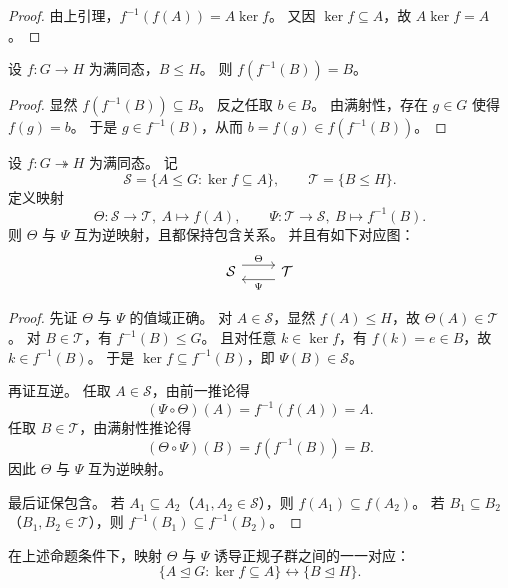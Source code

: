 \documentclass[lang=cn,a4paper,newtx]{elegantbook}
\begin{document}
\begin{proof}
由上引理，$f^{-1}(f(A))=A\ker f$。
又因 $\ker f\subseteq A$，故 $A\ker f=A$。
\end{proof}

\begin{corollary}
设 $f:G\to H$ 为满同态，$B\le H$。
则 $f(f^{-1}(B))=B$。
\end{corollary}

\begin{proof}
显然 $f(f^{-1}(B))\subseteq B$。
反之任取 $b\in B$。
由满射性，存在 $g\in G$ 使得 $f(g)=b$。
于是 $g\in f^{-1}(B)$，从而 $b=f(g)\in f(f^{-1}(B))$。
\end{proof}

\begin{proposition}[满同态下的子群对应]
设 $f:G\twoheadrightarrow H$ 为满同态。
记
\[
  \mathcal S=\{A\le G:\ker f\subseteq A\},\qquad \mathcal T=\{B\le H\}.
\]
定义映射
\[
  \Theta:\mathcal S\to \mathcal T,\ A\mapsto f(A),
\qquad
  \Psi:\mathcal T\to \mathcal S,\ B\mapsto f^{-1}(B).
\]
则 $\Theta$ 与 $\Psi$ 互为逆映射，且都保持包含关系。
并且有如下对应图：
\[
\begin{tikzcd}
 \mathcal S \arrow[r,shift left=1.2ex,"\Theta"] & \mathcal T \arrow[l,shift left=1.2ex,"\Psi"]
\end{tikzcd}
\]
\end{proposition}

\begin{proof}
先证 $\Theta$ 与 $\Psi$ 的值域正确。
对 $A\in \mathcal S$，显然 $f(A)\le H$，故 $\Theta(A)\in \mathcal T$。
对 $B\in \mathcal T$，有 $f^{-1}(B)\le G$。
且对任意 $k\in \ker f$，有 $f(k)=e\in B$，故 $k\in f^{-1}(B)$。
于是 $\ker f\subseteq f^{-1}(B)$，即 $\Psi(B)\in \mathcal S$。

再证互逆。
任取 $A\in \mathcal S$，由前一推论得
\[
  (\Psi\circ\Theta)(A)=f^{-1}(f(A))=A.
\]
任取 $B\in \mathcal T$，由满射性推论得
\[
  (\Theta\circ\Psi)(B)=f(f^{-1}(B))=B.
\]
因此 $\Theta$ 与 $\Psi$ 互为逆映射。

最后证保包含。
若 $A_1\subseteq A_2$（$A_1,A_2\in \mathcal S$），则 $f(A_1)\subseteq f(A_2)$。
若 $B_1\subseteq B_2$（$B_1,B_2\in \mathcal T$），则 $f^{-1}(B_1)\subseteq f^{-1}(B_2)$。
\end{proof}

\begin{corollary}
在上述命题条件下，映射 $\Theta$ 与 $\Psi$ 诱导正规子群之间的一一对应：
\[
  \{A\trianglelefteq G:\ker f\subseteq A\}\longleftrightarrow\{B\trianglelefteq H\}.
\]
\end{corollary}
\end{document}
